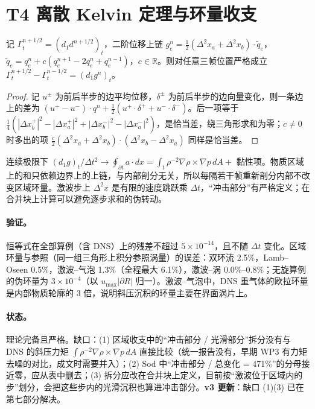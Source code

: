 \section{T4 离散 Kelvin 定理与环量收支}

\begin{theorem}
记 $\Gamma_t^{n+1/2}=(d_1d^{n+1/2})_t$，二阶位移上链 $g_e^n=\tfrac12(\Delta^2x_a+\Delta^2x_b)\cdot\tilde q_e$，$\tilde q_e=q_e^n+c(q_e^{n+1}-2q_e^n+q_e^{n-1})$，$c\in\mathbb R$。则对任意三帧位置严格成立 $\Gamma_t^{n+1/2}-\Gamma_t^{n-1/2}=(d_1g^n)_t$。
\end{theorem}
\begin{proof}
记 $u^\pm$ 为前后半步的边平均位移，$\delta^\pm$ 为前后半步的边向量变化，则一条边上的差为 $(u^+-u^-)\cdot q^n+\tfrac12(u^+\!\cdot\delta^++u^-\!\cdot\delta^-)$。后一项等于 $\tfrac14(|\Delta x_b^+|^2-|\Delta x_a^+|^2+|\Delta x_b^-|^2-|\Delta x_a^-|^2)$，是恰当差，绕三角形求和为零；$c\neq0$ 时多出的项 $\tfrac c2(\Delta^2x_a+\Delta^2x_b)\cdot(\Delta^2x_b-\Delta^2x_a)$ 同样是恰当差。
\end{proof}
连续极限下 $(d_1g)_t/\Delta t^2\to\oint_{\partial t}a\cdot dx=\int_t\rho^{-2}\nabla\rho\times\nabla p\,dA+$ 黏性项。物质区域上的和只依赖边界上的上链，与内部剖分无关，所以每隔若干帧重新剖分内部不改变区域环量。激波步上 $\Delta^2x$ 是有限的速度跳跃乘 $\Delta t$，“冲击部分”有严格定义；在合并块上计算可以避免逐步求和的伪转动。

\paragraph{验证。}恒等式在全部算例（含 DNS）上的残差不超过 $5\times10^{-14}$，且不随 $\Delta t$ 变化。区域环量与参照（同一组三角形上积分参照涡量）的误差：双环流 2.5\%，Lamb–Oseen 0.5\%，激波–气泡 1.3\%（全程最大 6.1\%），激波–涡 0.0\%–0.8\%；无旋算例的伪环量为 $3\times10^{-4}$（以 $u_{\max}|\partial R|$ 归一）。激波–气泡中，DNS 重气体的欧拉环量是内部物质轮廓的 3 倍，说明斜压沉积的环量主要在界面涡片上。

\paragraph{状态。}理论完备且严格。缺口：(1) 区域收支中的“冲击部分 / 光滑部分”拆分没有与 DNS 的斜压力矩 $\int\rho^{-2}\nabla\rho\times\nabla p\,dA$ 直接比较（统一报告没有，早期 WP3 有力矩去噪的对比，成文时需要并入）；(2) Sod 中“冲击部分 / 总变化 = 471\%”的分母接近零，应从表中删去；(3) 拆分应改在合并块上定义，目前按“激波位于区域内的步”划分，会把这些步内的光滑沉积也算进冲击部分。\textbf{v3 更新}：缺口 (1)(3) 已在第七部分解决。

